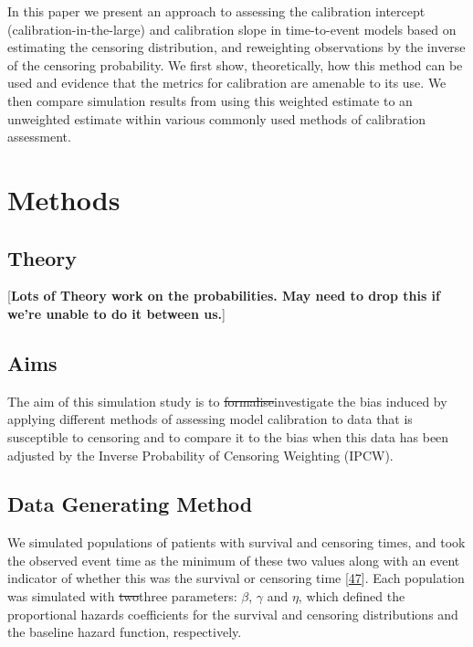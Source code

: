 \documentclass[12pt,PhD,twoside,openright]{muthesis}
\begin{document}
In this paper we present an approach to assessing the calibration intercept (calibration-in-the-large) and calibration slope in time-to-event models based on estimating the censoring distribution, and reweighting observations by the inverse of the censoring probability. We first show, theoretically, how this method can be used and evidence that the metrics for calibration are amenable to its use. We then compare simulation results from using this weighted estimate to an unweighted estimate within various commonly used methods of calibration assessment.

\hypertarget{methods-4}{%
\section{Methods}\label{methods-4}}

\hypertarget{theory}{%
\subsection{Theory}\label{theory}}

{[}\textbf{Lots of Theory work on the probabilities. May need to drop this if we're unable to do it between us.}{]}

\hypertarget{aims}{%
\subsection{Aims}\label{aims}}

The aim of this simulation study is to \sout{formalise}investigate the bias induced by applying different methods of assessing model calibration to data that is susceptible to censoring and to compare it to the bias when this data has been adjusted by the Inverse Probability of Censoring Weighting (IPCW).

\hypertarget{data-generating-method}{%
\subsection{Data Generating Method}\label{data-generating-method}}

We simulated populations of patients with survival and censoring times, and took the observed event time as the minimum of these two values along with an event indicator of whether this was the survival or censoring time {[}\protect\hyperlink{ref-burton_design_2006}{47}{]}. Each population was simulated with \sout{two}three parameters: \(\beta\), \(\gamma\) and \(\eta\), which defined the proportional hazards coefficients for the survival and censoring distributions and the baseline hazard function, respectively.
\end{document}
